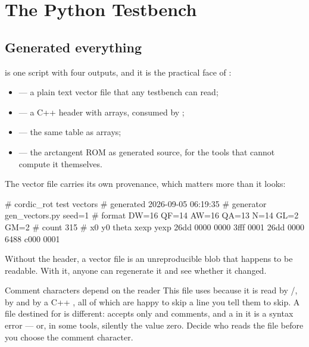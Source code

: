 \clearpage
{}

\clearpage
{}

\clearpage
\section{The Python Testbench}
\label{sec:case:python}

\subsection{Generated everything}

 is one script with four outputs, and it is the practical
face of :

\begin{itemize}
  \item {} --- a plain text vector file that
        any testbench can read;
  \item {} --- a C++ header with
         arrays, consumed by ;
  \item {} --- the same table as \SV{}
         arrays;
  \item {} --- the arctangent ROM as generated
        source, for the tools that cannot compute it themselves.
\end{itemize}

The vector file carries its own provenance, which matters more than it looks:

\begin{txtcode}
# cordic_rot test vectors
# generated 2026-09-05 06:19:35
# generator  gen_vectors.py  seed=1
# format     DW=16 QF=14 AW=16 QA=13 N=14 GL=2 GM=2
# count      315
# x0    y0    theta xexp  yexp
26dd  0000  0000  3fff  0001
26dd  0000  6488  c000  0001
\end{txtcode}

Without the header, a vector file is an unreproducible blob that happens to
be readable. With it, anyone can regenerate it and see whether it changed.

\begin{gotcha}{Comment characters depend on the reader}
This file uses \code{\#} because it is read by /,
by  and by a C++ , all of which are happy to
skip a line you tell them to skip. A file destined for  is
different:  accepts only \code{//} and \code{/* */}
comments, and a \code{\#} in it is a syntax error --- or, in some tools,
silently the value zero. Decide who reads the file before you choose the
comment character.
\end{gotcha}

